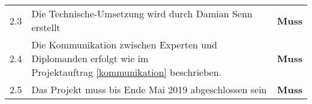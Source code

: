 \begin{longtable}[]{@{}llc@{}}
  2.3  & Die Technische-Umsetzung wird durch Damian Senn erstellt                                                                         & \textbf{Muss}\tabularnewline
  2.4  & \makecell[l]{Die Kommunikation zwischen Experten und Diplomanden erfolgt wie im                                                                                 \\ Projektauftrag \ref{kommunikation} beschrieben.} & \textbf{Muss}\tabularnewline
  2.5  & Das Projekt muss bis Ende Mai 2019 abgeschlossen sein                                                                            & \textbf{Muss}\tabularnewline
  \bottomrule
\end{longtable}
